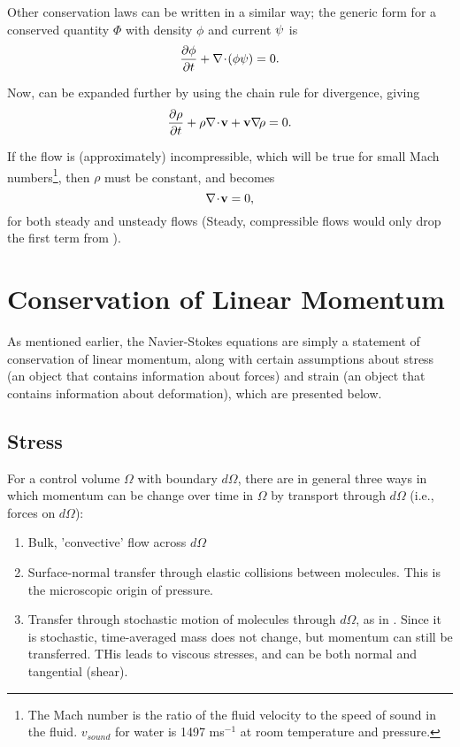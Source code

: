 Other conservation laws can be written in a similar way; the generic form for a conserved quantity $\Phi$ with density $\phi$ and current $\mathbf{\psi}$ is 
\begin{equation}
\pder{1}{\phi}{t} + \Div{\paren{\phi\Vector{\psi}}} = 0.
\end{equation}

Now,  can be expanded further by using the chain rule for divergence, giving
\begin{equation}\label{eq:expandedMass}
\pder{1}{\rho}{t} + \rho\Div{\Vector{v}} + \Vector{v}\Grad{\rho}=0.
\end{equation}

If the flow is (approximately) incompressible, which will be true for small Mach numbers\footnote{The Mach number is the ratio of the fluid velocity to the speed of sound in the fluid. $v_{sound}$ for water is 1497 ms$^{-1}$ at room temperature and pressure.}, then $\rho$ must be constant, and  becomes 
\begin{equation}\label{eq:consMassIncomp}
\nabla\!\cdot\!\mathbf{v} = 0,
\end{equation}
for both steady and unsteady flows (Steady, compressible flows would only drop the first term from ).

\section{Conservation of Linear Momentum} 

As mentioned earlier, the Navier-Stokes equations are simply a statement of conservation of linear momentum, along with certain assumptions about stress (an object that contains information about forces) and strain (an object that contains information about deformation), which are presented below. 
\subsection{Stress}
For a control volume $\Omega$ with boundary $d\Omega$, there are in general three ways in which momentum can be change over time in $\Omega$ by transport through $d\Omega$ (i.e., forces on $d\Omega$): 
\begin{enumerate}
\item{Bulk, 'convective' flow across $d\Omega$}
\item{Surface-normal transfer through elastic collisions between molecules. This is the microscopic origin of pressure.}
\item{Transfer through stochastic motion of molecules through $d\Omega$, as in . Since it is stochastic, time-averaged mass does not change, but momentum can still be transferred. THis leads to viscous stresses, and can be both normal and tangential (shear).}
\end{enumerate}

